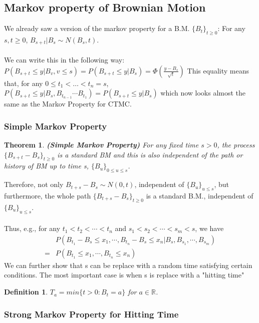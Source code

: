 \documentclass[12pt]{article}
\newtheorem{definition}{Definition}
\newtheorem{theorem}{Theorem}
\begin{document}
\subsection{Markov property of Brownian Motion}

We already saw a version of the markov property for a B.M. $\{B_t\}_{t\geq 0}$: For any $s, t \geq 0$, $B_{s+t}|B_s \sim N(B_s,t)$.
\\
\\
We can write this in the following way:
$P(B_{s+t}\leq y | B_v, v\leq s) = P(B_{s+t} \leq y | B_s) =\Phi (\frac{y-B_s}{\sqrt{t}})$ This equality means that, for any $0 \leq t_1 < \dots < t_n = s$, $P(B_{s+t} \leq y | B_s, B_{t_{n-1}}\cdots B_{t_1}) = P(B_{s+t} \leq y | B_s)$ which now looks almost the same as the Markov Property for CTMC.

\subsubsection{Simple Markov Property}

\begin{theorem}
    \textbf{(Simple Markov Property)} For any fixed time $s > 0$, the process $\{B_{s+t} - B_s\}_{t\geq 0}$ is a standard BM and this is also independent of the path or history of BM up to time s, $\{B_u\}_{0\leq u \leq s}$.
\end{theorem}

\noindent Therefore, not only $B_{t+s} - B_s \sim N(0,t)$, independent of $\{B_u\}_{u \leq s}$, but furthermore, the whole path $\{B_{t+s} - B_s\}_{t\geq 0}$ is a standard B.M., independent of $\{B_u\}_{u \leq s}$.
\\
\\
\noindent Thus, e.g., for any $t_1 < t_2 < \cdots < t_n$ and $s_1 < s_2 < \cdots < s_m < s$, we have
\begin{align*}
    & P(B_{t_1} - B_s \leq x_1, \cdots, B_{t_n} - B_s \leq x_n| B_s, B_{s_1}, \cdots, B_{s_m})\\
    = & P(B_{t_1}\leq x_1, \cdots, B_{t_n}\leq x_n)
\end{align*}
We can further show that s can be replace with a random time satisfying certain conditions. The most important case is when s is replace with a "hitting time"
\begin{definition}
    $T_a = min\{ t > 0: B_t = a\}$ for $a \in \mathbb{R}$.
\end{definition}

\subsubsection{Strong Markov Property for Hitting Time}
\end{document}
